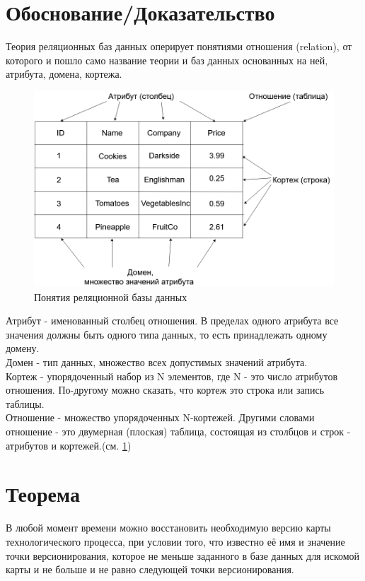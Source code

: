 \section{Обоснование/Доказательство}
\indent Теория реляционных баз данных оперирует понятиями отношения (relation), от которого и пошло само название теории и баз данных основанных на ней, атрибута, домена, кортежа.

\begin{figure}[ht]
	\centering
	\includegraphics[width=\linewidth]{pics/databaseExample.png}
	\caption{Понятия реляционной базы данных}
	\label{fig:dbExample}
\end{figure}

\indent Атрибут - именованный столбец отношения.
В пределах одного атрибута все значения должны быть одного типа данных, то есть принадлежать одному домену.\\
\indent Домен - тип данных, множество всех допустимых значений атрибута.\\
\indent Кортеж - упорядоченный набор из N элементов, где N - это число атрибутов отношения.
По-другому можно сказать, что кортеж это строка или запись таблицы.\\
\indent Отношение - множество упорядоченных N-кортежей.
Другими словами отношение - это двумерная (плоская) таблица, состоящая из столбцов и строк - атрибутов и кортежей.(см. \ref{fig:dbExample})\\


\section{Теорема}
\begin{theorem}
	\label{th:th1}
	В любой момент времени можно восстановить необходимую версию карты технологического процесса, при условии того, что известно её имя и значение точки версионирования, которое не меньше заданного в базе данных для искомой карты и не больше и не равно следующей точки версионирования.
\end{theorem}

